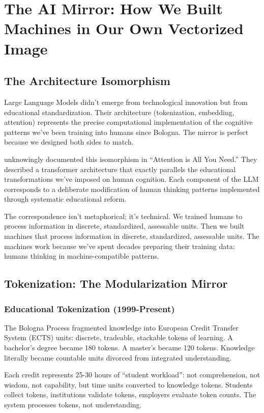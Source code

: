 \section{The AI Mirror: How We Built Machines in Our Own Vectorized Image}
\label{sec:ai-mirror}

\subsection{The Architecture Isomorphism}

Large Language Models didn't emerge from technological innovation but from educational standardization. Their architecture (tokenization, embedding, attention) represents the precise computational implementation of the cognitive patterns we've been training into humans since Bologna. The mirror is perfect because we designed both sides to match.

\citet{vaswani2017} unknowingly documented this isomorphism in ``Attention is All You Need.'' They described a transformer architecture that exactly parallels the educational transformations we've imposed on human cognition. Each component of the LLM corresponds to a deliberate modification of human thinking patterns implemented through systematic educational reform.

The correspondence isn't metaphorical; it's technical. We trained humans to process information in discrete, standardized, assessable units. Then we built machines that process information in discrete, standardized, assessable units. The machines work because we've spent decades preparing their training data: humans thinking in machine-compatible patterns.

\subsection{Tokenization: The Modularization Mirror}

\subsubsection{Educational Tokenization (1999-Present)}

The Bologna Process fragmented knowledge into European Credit Transfer System (ECTS) units: discrete, tradeable, stackable tokens of learning. A bachelor's degree became 180 tokens. A master's became 120 tokens. Knowledge literally became countable units divorced from integrated understanding.

Each credit represents 25-30 hours of ``student workload'': not comprehension, not wisdom, not capability, but time units converted to knowledge tokens. Students collect tokens, institutions validate tokens, employers evaluate token counts. The system processes tokens, not understanding.

